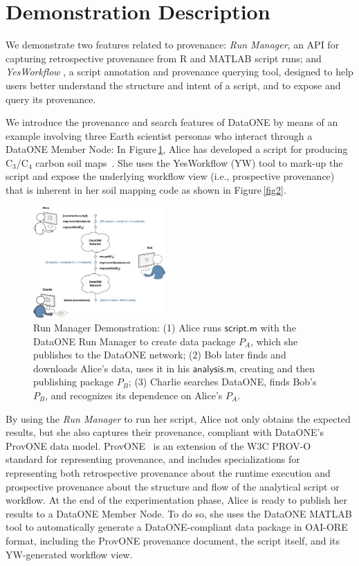 \documentclass[a4paper]{llncs}
\newcommand{\code}[1]{\ensuremath{\mathsf{#1}}}
\newcommand{\Figref}[1]{Figure\,\ref{#1}}
\begin{document}
\section{Demonstration Description}  \label{demo}

We demonstrate two features related to provenance: \emph{Run Manager}, an API for capturing retrospective provenance from R \cite{recordr} and MATLAB \cite{matlabdataone} script runs; and \emph{YesWorkflow} \cite{yesworkflow}, a script annotation and provenance querying tool, designed to help users better understand the structure and intent of a script, and to expose and query its provenance.

We introduce the provenance and search features of DataONE by means of an example involving three Earth scientist personas who interact through a DataONE Member Node: In \Figref{fig0}, Alice has developed a script for producing C$_3$/C$_4$ carbon soil maps~\cite{MsTMIP-model-driver-data-set}.  She uses the YesWorkflow (YW) tool to mark-up the script and expose the underlying workflow view (i.e., prospective provenance) that is inherent in her soil mapping code as shown in \Figref{fig2}.

\begin{figure}[t]  
\centering 
\includegraphics[width=0.45\textwidth]{figs/alice-bob-charlie-sequence-crop} \caption{Run Manager Demonstration: (1) Alice runs \code{script.m} with the DataONE Run Manager to create data package $P_A$, which she publishes to the DataONE network; (2) Bob later finds and downloads Alice's data, uses it in his \code{analysis.m}, creating and then publishing package $P_B$; (3) Charlie searches DataONE, finds Bob's $P_B$, and recognizes its dependence on Alice's $P_A$.}  \label{fig0} 
\end{figure}

By using the \emph{Run Manager} to run her script, Alice not only obtains the expected results, but she also captures their provenance, compliant with DataONE's ProvONE data model. 
ProvONE~\cite{provone} is an extension of the W3C PROV-O~\cite{prov-o} standard for representing provenance, and includes specializations for representing both retrospective provenance about the runtime execution and prospective provenance about the structure and flow of the analytical script or workflow.
%
At the end of the experimentation phase, Alice is ready to publish her results to a DataONE Member Node.  To do so, she uses the DataONE MATLAB tool to automatically generate a DataONE-compliant data package in OAI-ORE format, including the ProvONE provenance document, the script itself, and its YW-generated workflow view.
\end{document}
